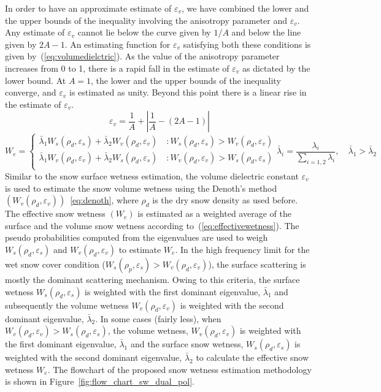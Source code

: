 In order to have an approximate estimate of $\varepsilon_v$, we have combined the lower and the upper bounds of the inequality involving the anisotropy parameter and $\varepsilon_v$. Any estimate of  $\varepsilon_v$ cannot lie below the curve given by $1/ A$ and below the line given by $2A-1$. An estimating function for $\varepsilon_v$ satisfying both these conditions is given by~(\ref{eq:volumedielctric}). As the value of the anisotropy parameter increases from 0 to 1, there is a rapid fall in the estimate of $\varepsilon_v$ as dictated by the lower bound. At $A=1$, the lower and the upper bounds of the inequality converge, and $\varepsilon_v$ is estimated as unity. Beyond this point there is a linear rise in the estimate of $\varepsilon_v$. 
\begin{equation}
\varepsilon_v = \frac{1}{A} + \left| \frac{1}{A} - (2A - 1)\right|
\label{eq:volumedielctric}
\end{equation}
\begin{equation}
W_e=
\begin{cases}
\bar{\lambda}_{1}W_s(\rho_d,\varepsilon_s) + \bar{\lambda}_{2}W_v(\rho_d,\varepsilon_v) \quad: W_s(\rho_d,\varepsilon_s) > W_v(\rho_d,\varepsilon_v) \\ 
\bar{\lambda}_{1}W_v(\rho_d,\varepsilon_v) + \bar{\lambda}_{2}W_s(\rho_d,\varepsilon_s) \quad: W_v(\rho_d,\varepsilon_v) > W_s(\rho_d,\varepsilon_s) \\
\end{cases}
\bar{\lambda}_{i} = \frac{\lambda_i}{\sum_{i=1,2}^{}\lambda_i}, \quad
\bar{\lambda}_{1} > \bar{\lambda}_{2}
\label{eq:effectivewetness}
\end{equation}
Similar to the snow surface wetness estimation, the volume dielectric constant $\varepsilon_v$ is used to estimate the snow volume wetness using the Denoth's method $(W_v (\rho_d,\varepsilon_v))$~\eqref{eq:denoth}, where $\rho_d$ is the dry snow density as used before. The effective snow wetness $(W_e)$ is estimated as a weighted average of the surface and the volume snow wetness according to~(\ref{eq:effectivewetness}). The pseudo probabilities computed from the eigenvalues are used to weigh $W_s(\rho_d,\varepsilon_s)$ and $W_v(\rho_d,\varepsilon_v)$ to estimate $W_e$. In the high frequency limit for the wet snow cover condition ($W_s(\rho_p,\varepsilon_s) > W_v(\rho_d,\varepsilon_v)$), the surface scattering is mostly the dominant scattering mechanism. Owing to this criteria, the surface wetness $W_s(\rho_d,\varepsilon_s)$ is weighted with the first dominant eigenvalue, $\bar{\lambda}_{1}$ and subsequently the volume wetness $W_v(\rho_d,\varepsilon_v)$ is weighted with the second dominant eigenvalue, $\bar{\lambda}_{2}$. In some cases (fairly less), when $W_v(\rho_d,\varepsilon_v) > W_s(\rho_d,\varepsilon_s)$, the volume wetness, $W_v(\rho_d,\varepsilon_v)$ is weighted with the first dominant eigenvalue, $\bar{\lambda}_{1}$ and the surface snow wetness, $W_s(\rho_d,\varepsilon_s)$ is weighted with the second dominant eigenvalue, $\bar{\lambda}_{2}$ to calculate the effective snow wetness $W_{e}$. The flowchart of the proposed snow wetness estimation methodology is shown in Figure~\ref{fig:flow_chart_sw_dual_pol}.

